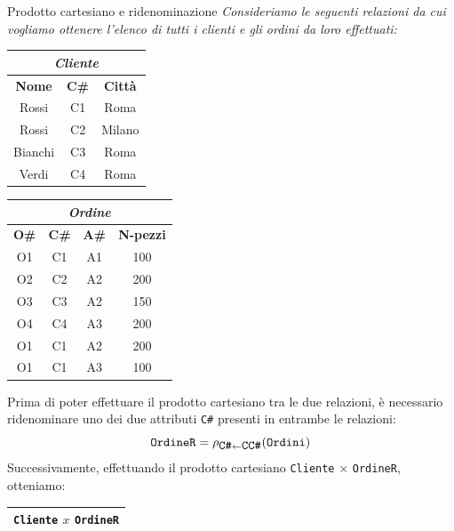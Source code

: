 \begin{Example}{Prodotto cartesiano e ridenominazione}{}
    \textit{Consideriamo le seguenti relazioni da cui vogliamo ottenere l'elenco di tutti i clienti e gli ordini da loro effettuati:}
    \begin{center}
        \begin{tabular}{|c|c|c|}
            \hline\multicolumn{3}{|c|}{\textit{Cliente}}\\\hline
            \textbf{Nome} & \textbf{C\#} & \textbf{Città}\\\hline
            Rossi & C1 & Roma\\
            Rossi & C2 & Milano\\
            Bianchi & C3 & Roma\\
            Verdi & C4 & Roma\\\hline
        \end{tabular}
        \begin{tabular}{|c|c|c|c|}
            \hline\multicolumn{4}{|c|}{\textit{Ordine}}\\\hline
            \textbf{O\#} & \textbf{C\#} & \textbf{A\#} & \textbf{N-pezzi}\\\hline
            O1 & C1 & A1 & 100\\
            O2 & C2 & A2 & 200\\
            O3 & C3 & A2 & 150\\
            O4 & C4 & A3 & 200\\
            O1 & C1 & A2 & 200\\
            O1 & C1 & A3 & 100\\\hline
        \end{tabular}
        \bigskip
    \end{center}
    Prima di poter effettuare il prodotto cartesiano tra le due relazioni, è necessario ridenominare uno dei due attributi \verb|C#| presenti in entrambe le relazioni:
    \begin{equation*}
        \verb|OrdineR| = \rho_{\verb|C#|\leftarrow \verb|CC#|}(\verb|Ordini|)
    \end{equation*}
    Successivamente, effettuando il prodotto cartesiano \verb|Cliente| × \verb|OrdineR|, otteniamo:
    \begin{center}
        \begin{tabular}{|c|c|c|c|c|c|c|}
            \hline\multicolumn{7}{|c|}{\Verb|Cliente| $x$ \Verb|OrdineR|}\\\hline

\end{tabular}
\end{center}
\end{Example}
